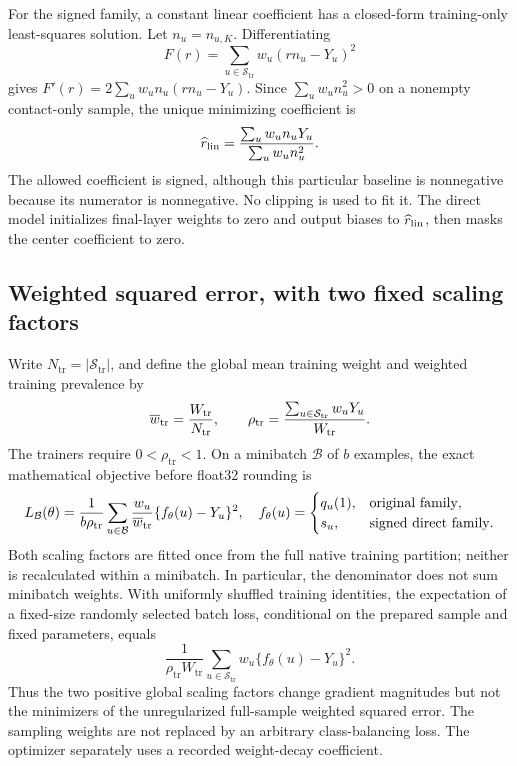 \documentclass[11pt,a4paper]{article}
\begin{document}
For the signed family, a constant linear coefficient has a closed-form
training-only least-squares solution. Let $n_u=n_{u,K}$. Differentiating
\begin{equation}
 F(r)=\sum_{u\in\mathcal S_{\mathrm{tr}}}w_u(rn_u-Y_u)^2
\end{equation}
gives $F'(r)=2\sum_uw_un_u(rn_u-Y_u)$. Since
$\sum_uw_un_u^2>0$ on a nonempty contact-only sample, the unique minimizing
coefficient is
\begin{equation}
 \widehat r_{\rm lin}=
 \frac{\sum_uw_un_uY_u}{\sum_uw_un_u^2}.
 \label{eq:prob-linear-init}
\end{equation}
The allowed coefficient is signed, although this particular baseline is
nonnegative because its numerator is nonnegative. No clipping is used to fit
it. The direct model initializes final-layer weights to zero and output
biases to $\widehat r_{\rm lin}$, then masks the center coefficient to zero.

\subsection{Weighted squared error, with two fixed scaling factors}

Write $N_{\mathrm{tr}}=|\mathcal S_{\mathrm{tr}}|$, and define the global mean
training weight and weighted training prevalence by
\begin{equation}
 \overline w_{\rm tr}=\frac{W_{\mathrm{tr}}}{N_{\mathrm{tr}}},\qquad
 \rho_{\mathrm{tr}}=\frac{\sum_{u\in\mathcal S_{\mathrm{tr}}}w_uY_u}{W_{\mathrm{tr}}}.
\end{equation}
The trainers require $0<\rho_{\mathrm{tr}}<1$. On a minibatch $\mathcal B$ of
$b$ examples, the exact mathematical objective before float32 rounding is
\begin{equation}
 L_{\mathcal B}(\theta)=
 \frac{1}{b\rho_{\mathrm{tr}}}
 \sum_{u\in\mathcal B}\frac{w_u}{\overline w_{\rm tr}}
    \{f_\theta(u)-Y_u\}^{2},
 \quad
 f_\theta(u)=
 \begin{cases}q_u(1),&\text{original family},\\
               s_u,&\text{signed direct family}.
 \end{cases}
 \label{eq:prob-minibatch-loss}
\end{equation}
Both scaling factors are fitted once from the full native training partition;
neither is recalculated within a minibatch. In particular, the denominator
does not sum minibatch weights. With uniformly shuffled training identities,
the expectation of a fixed-size randomly selected batch loss, conditional on
the prepared sample and fixed parameters, equals
\begin{equation}
 \frac{1}{\rho_{\mathrm{tr}}W_{\mathrm{tr}}}
 \sum_{u\in\mathcal S_{\mathrm{tr}}}w_u\{f_\theta(u)-Y_u\}^{2}.
\end{equation}
Thus the two positive global scaling factors change gradient magnitudes but
not the minimizers of the unregularized full-sample weighted squared error.
The sampling weights are not replaced by an arbitrary class-balancing loss.
The optimizer separately uses a recorded weight-decay coefficient.
\end{document}
